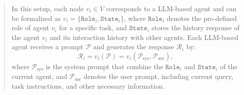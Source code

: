 \documentclass[11pt]{article}
\begin{document}
\begin{abstract}
In this setup, each node $v_{i} \in V$ corresponds to a LLM-based agent and can be formalized as
$v_{i} = \{\texttt{Role}_{i},\texttt{State}_{i}\}$, where $\texttt{Role}_{i}$ denotes the pre-defined role of agent $v_{i}$ for a specific task, and $\texttt{State}_{i}$ stores the history response of the agent $v_{i}$ and its interaction history with other agents.  Each LLM-based agent receives a prompt $\mathcal{P}$ and generates the response $\mathcal{R}_{i}$ by:
\begin{equation}
    \mathcal{R}_{i} = v_{i}(\mathcal{P}) = v_{i}(\mathcal{P}_{\text{sys}},\mathcal{P}_{\text{usr}}),
\end{equation}
where $\mathcal{P}_{\text{sys}}$ is the system prompt that combine the $\texttt{Role}_{i}$ and $\texttt{State}_{i}$ of the current agent, and $\mathcal{P}_{\text{usr}}$ denotes the user prompt, including current query, task instructions, and other necessary information.



\end{abstract}
\end{document}
